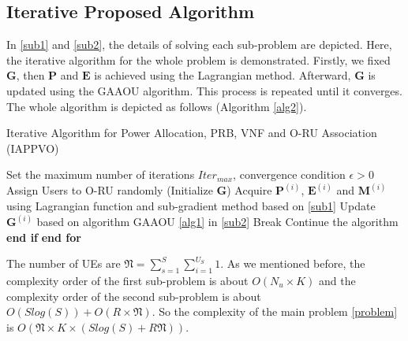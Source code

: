 \documentclass[conference]{IEEEtran}
\begin{document}
\subsection{Iterative Proposed Algorithm}
In \eqref{sub1} and \eqref{sub2}, the details of solving each sub-problem are depicted. 
Here, the iterative algorithm for the whole problem is demonstrated.
Firstly, we fixed $\boldsymbol{G}$, then $\boldsymbol{P}$ and $\boldsymbol{E}$ is achieved using the Lagrangian method.  
Afterward, $\boldsymbol{G}$ is updated using the GAAOU algorithm. This process is repeated until it converges. 
The whole algorithm is depicted as follows (Algorithm \eqref{alg2}).
 \begin{algorithm}
\caption{Iterative Algorithm for Power Allocation, PRB, VNF and O-RU Association (IAPPVO)}\label{alg2}
\begin{algorithmic}[1]
\State  Set the maximum number of iterations ${Iter}_{max}$, convergence condition $\epsilon > 0$ \label{a21}
\State  Assign Users to O-RU randomly (Initialize $\boldsymbol{G}$) \label{a22}
\label{23}
\State Acquire $\boldsymbol{P}^{(i)}$, $\boldsymbol{E}^{(i)}$ and $\boldsymbol{M}^{(i)}$ using Lagrangian function and sub-gradient method based on \eqref{sub1}
\State Update $\boldsymbol{G}^{(i)}$   based on algorithm GAAOU \eqref{alg1} in  \eqref{sub2}
\State Break
\Else 
\State Continue the algorithm  
\EndIf
\State \textbf{end if}
\EndFor
\State \textbf{end for} \label{24}
\end{algorithmic}
\end{algorithm}
The number of UEs are $\mathfrak{N} = \sum_{s=1}^{S}\sum_{i=1}^{U_S}1$.
As we mentioned before, the complexity order of the first sub-problem is about $O(N_u \times K)$
and the complexity order of the second sub-problem is about $O(Slog(S)) + O(R\times \mathfrak{N})$.
So the complexity of the main problem \eqref{problem} is $O(\mathfrak{N} \times K \times (Slog(S)+R\mathfrak{N}))$.
\end{document}
